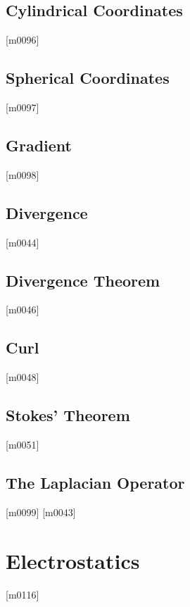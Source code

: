 \documentclass[10pt,letterpaper,twocolumn,openany]{book}
\theoremstyle{definition} %
\begin{document}
    \section{Cylindrical Coordinates}
{\color{blue}\tiny[m0096]}      
      \vfill\break
    \section{Spherical Coordinates}
{\color{blue}\tiny[m0097]}      
      \vfill\break
    \section{Gradient}
{\color{blue}\tiny[m0098]}      
      \vfill\break
    \section{Divergence}
{\color{blue}\tiny[m0044]}      
      \vfill\break
    \section{Divergence Theorem}
{\color{blue}\tiny[m0046]}      
      \vfill\break
    \section{Curl}
{\color{blue}\tiny[m0048]}      
      \vfill\break
    \section{Stokes' Theorem}
{\color{blue}\tiny[m0051]}      
      \vfill\break
    \section{The Laplacian Operator}
{\color{blue}\tiny[m0099]}      
{\color{blue}\tiny[m0043]}    
  \chapter{Electrostatics}
  \thispagestyle{fancy} %
  \fancyhf{}            %
{\color{blue}\tiny[m0116]}    
\end{document}
